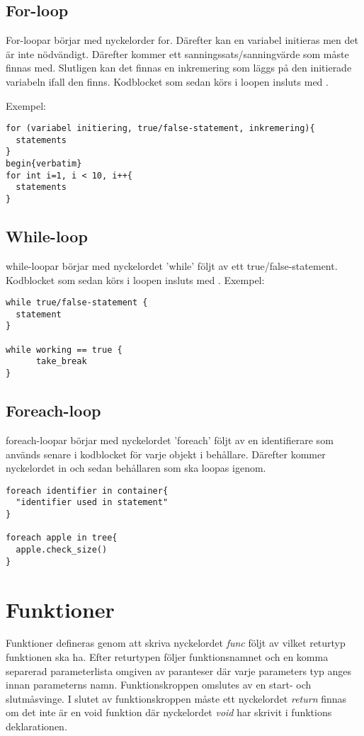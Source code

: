 \documentclass{TDP003mall}
\begin{document}
\subsection{For-loop}
For-loopar börjar med nyckelorder for. Därefter kan en variabel initieras men det är inte nödvändigt. Därefter kommer ett sanningssats/sanningvärde som måste finnas med. Slutligen kan det finnas en inkremering som läggs på den initierade variabeln ifall den finns. Kodblocket som sedan körs i loopen insluts med {}.

Exempel:
\begin{verbatim}
for (variabel initiering, true/false-statement, inkremering){
  statements
}
begin{verbatim}
for int i=1, i < 10, i++{
  statements
}
\end{verbatim}
\subsection{While-loop}
while-loopar börjar med nyckelordet 'while' följt av ett true/false-statement. Kodblocket som sedan körs i loopen insluts med {}.
Exempel:
\begin{verbatim}
while true/false-statement {
  statement
}

while working == true {
      take_break
}
\end{verbatim}
\subsection{Foreach-loop}
foreach-loopar börjar med nyckelordet 'foreach' följt av en identifierare som används senare i kodblocket för varje objekt i behållare.
Därefter kommer nyckelordet in och sedan behållaren som ska loopas igenom. 
\begin{verbatim}
foreach identifier in container{
  "identifier used in statement"
}

foreach apple in tree{
  apple.check_size()
}
\end{verbatim}
    \section{Funktioner}
    Funktioner defineras genom att skriva nyckelordet \emph{func} följt av vilket returtyp funktionen ska ha. Efter returtypen följer funktionsnamnet och en komma separerad parameterlista omgiven av paranteser där varje parameters typ anges innan parameterns namn. Funktionskroppen omslutes av en start- och slutmåsvinge. I slutet av funktionskroppen måste ett nyckelordet \emph{return} finnas om det inte är en void funktion där nyckelordet \emph{void} har skrivit i funktions deklarationen.
\end{document}
